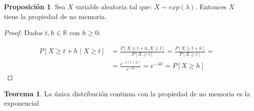 \documentclass[a4paper,10pt]{scrartcl}
\theoremstyle{definition}
\newtheorem*{theorem}{Teorema}
\newtheorem*{fact}{Proposición}
\numberwithin{equation}{section}
\begin{document}
\begin{fact}
 Sea $X$ variable aleatoria tal que: $X \sim exp(\lambda)$. Entonces $X$ tiene la propiedad de no memoria.
\end{fact}

\begin{proof}
Dados $t,h \in \mathbb{R}$ con $h\ge 0$:

 \begin{align*}
 P[X \ge t+h \mid X\ge t]   & = \frac{P[X\ge t+h, X\ge t]}{P[X\ge t]} =  \frac{P[X\ge t+h]}{P[X\ge t]} =\\ 
			    & = \frac{e^{-\lambda (t+h)}}{e^{-\lambda t}} = e^{-\lambda h} = P[X\ge h] 
 \end{align*}
\end{proof}



\begin{theorem}
 La única distribución continua con la propiedad de no memoria es la exponencial
\end{theorem}
\end{document}
